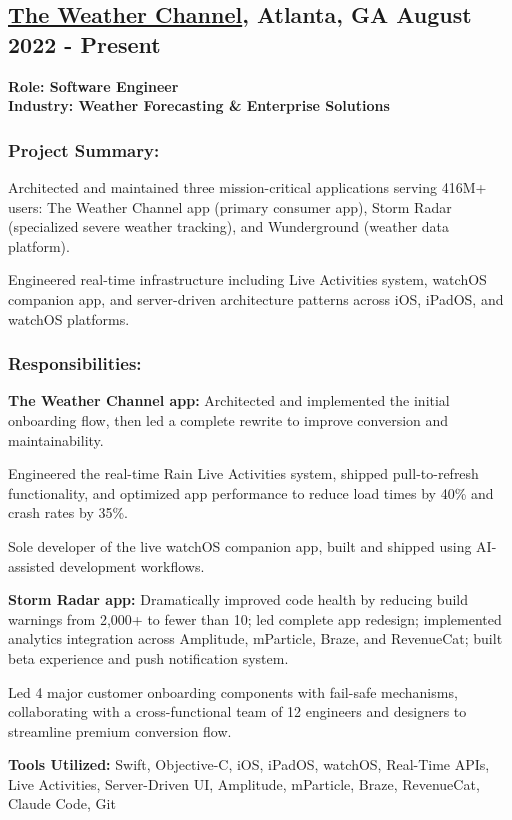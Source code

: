 \subsection{\textbf{\href{https://weather.com}{The Weather Channel}, Atlanta, GA} \hfill August 2022 - Present}
\noindent\textbf{Role: Software Engineer}\\
\noindent\textbf{Industry: Weather Forecasting \& Enterprise Solutions}

\subsubsection*{\textbf{Project Summary:}}
\begin{zitemize}
\item Architected and maintained three mission-critical applications serving 416M+ users: The Weather Channel app (primary consumer app), Storm Radar (specialized severe weather tracking), and Wunderground (weather data platform).
\item Engineered real-time infrastructure including Live Activities system, watchOS companion app, and server-driven architecture patterns across iOS, iPadOS, and watchOS platforms.
\end{zitemize}

\subsubsection*{\textbf{Responsibilities:}}
\begin{zitemize}
\item \textbf{The Weather Channel app:} Architected and implemented the initial onboarding flow, then led a complete rewrite to improve conversion and maintainability.
\item Engineered the real-time Rain Live Activities system, shipped pull-to-refresh functionality, and optimized app performance to reduce load times by 40\% and crash rates by 35\%.
\item Sole developer of the live watchOS companion app, built and shipped using AI-assisted development workflows.
\item \textbf{Storm Radar app:} Dramatically improved code health by reducing build warnings from 2,000+ to fewer than 10; led complete app redesign; implemented analytics integration across Amplitude, mParticle, Braze, and RevenueCat; built beta experience and push notification system.
\item Led 4 major customer onboarding components with fail-safe mechanisms, collaborating with a cross-functional team of 12 engineers and designers to streamline premium conversion flow.
\end{zitemize}

\noindent\textbf{Tools Utilized:} Swift, Objective-C, iOS, iPadOS, watchOS, Real-Time APIs, Live Activities, Server-Driven UI, Amplitude, mParticle, Braze, RevenueCat, Claude Code, Git